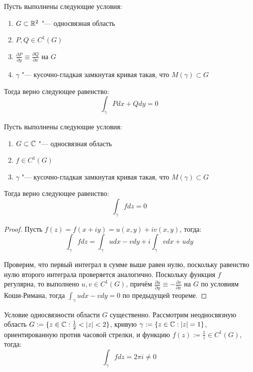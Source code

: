 \begin{theorem}[из матанализа б/д]
	Пусть выполнены следующие условия:
	\begin{enumerate}
		\item $G \subset \mathbb{R}^2$ "--- односвязная область
		
		\item $P, Q \in C^1(G)$
		
		\item $\frac{\partial P}{\partial y} \equiv \frac{\partial Q}{\partial x}$ на $G$
		
		\item $\gamma$ "--- кусочно-гладкая замкнутая кривая такая, что $M(\gamma) \subset G$
	\end{enumerate}

	Тогда верно следующее равенство:
	\[\int_\gamma Pdx + Qdy = 0\]
\end{theorem}

\begin{theorem}
	Пусть выполнены следующие условия:
	\begin{enumerate}
		\item $G \subset \mathbb{C}$ "--- односвязная область
		\item $f \in C^1(G)$
		\item $\gamma$ "--- кусочно-гладкая замкнутая кривая такая, что $M(\gamma) \subset G$
	\end{enumerate}
	
	Тогда верно следующее равенство:
	\[\int_\gamma fdz = 0\]
\end{theorem}

\begin{proof}
	Пусть $f(z) = f(x + iy) = u(x, y) + iv(x, y)$, тогда:
	\[\int_\gamma fdz = \int_\gamma udx - vdy + i\int_\gamma vdx + udy\]
	
	Проверим, что первый интеграл в сумме выше равен нулю, поскольку равенство нулю второго интеграла проверяется аналогично. Поскольку функция $f$ регулярна, то выполнено $u, v \in C^1(G)$, причём $\frac{\partial u}{\partial y} \equiv -\frac{\partial v}{\partial x}$ на $G$ по условиям Коши-Римана, тогда $\int_\gamma udx - vdy = 0$ по предыдущей теореме.
\end{proof}

\begin{note}
	Условие односвязности области $G$ существенно. Рассмотрим неодносвязную область $G := \{z \in \mathbb{C} : \frac12 < |z| < 2\}$, кривую $\gamma := \{z \in \mathbb{C} : |z| = 1\}$, ориентированную против часовой стрелки, и функцию $f(z) := \frac 1z \in C^1(G)$, тогда:
	\[\int_\gamma fdz = 2\pi i  \ne 0\]
\end{note}

